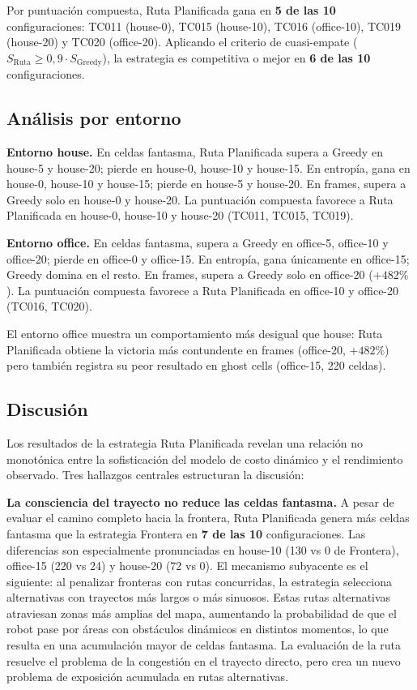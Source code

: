 Por puntuación compuesta, Ruta Planificada gana en \textbf{5 de las 10} configuraciones: TC011 (house-0), TC015 (house-10), TC016 (office-10), TC019 (house-20) y TC020 (office-20). Aplicando el criterio de cuasi-empate ($S_{\text{Ruta}} \geq 0{,}9 \cdot S_{\text{Greedy}}$), la estrategia es competitiva o mejor en \textbf{6 de las 10} configuraciones.

\subsection{Análisis por entorno}

\textbf{Entorno house.} En celdas fantasma, Ruta Planificada supera a Greedy en house-5 y house-20; pierde en house-0, house-10 y house-15. En entropía, gana en house-0, house-10 y house-15; pierde en house-5 y house-20. En frames, supera a Greedy solo en house-0 y house-20. La puntuación compuesta favorece a Ruta Planificada en house-0, house-10 y house-20 (TC011, TC015, TC019).

\textbf{Entorno office.} En celdas fantasma, supera a Greedy en office-5, office-10 y office-20; pierde en office-0 y office-15. En entropía, gana únicamente en office-15; Greedy domina en el resto. En frames, supera a Greedy solo en office-20 ($+482\%$). La puntuación compuesta favorece a Ruta Planificada en office-10 y office-20 (TC016, TC020).

El entorno office muestra un comportamiento más desigual que house: Ruta Planificada obtiene la victoria más contundente en frames (office-20, $+482\%$) pero también registra su peor resultado en ghost cells (office-15, 220 celdas).

\subsection{Discusión}%
\label{sec:exp_e2_discusion}

Los resultados de la estrategia Ruta Planificada revelan una relación no monotónica entre la sofisticación del modelo de costo dinámico y el rendimiento observado. Tres hallazgos centrales estructuran la discusión:

\textbf{La consciencia del trayecto no reduce las celdas fantasma.} A pesar de evaluar el camino completo hacia la frontera, Ruta Planificada genera más celdas fantasma que la estrategia Frontera en \textbf{7 de las 10} configuraciones. Las diferencias son especialmente pronunciadas en house-10 (130 vs 0 de Frontera), office-15 (220 vs 24) y house-20 (72 vs 0). El mecanismo subyacente es el siguiente: al penalizar fronteras con rutas concurridas, la estrategia selecciona alternativas con trayectos más largos o más sinuosos. Estas rutas alternativas atraviesan zonas más amplias del mapa, aumentando la probabilidad de que el robot pase por áreas con obstáculos dinámicos en distintos momentos, lo que resulta en una acumulación mayor de celdas fantasma. La evaluación de la ruta resuelve el problema de la congestión en el trayecto directo, pero crea un nuevo problema de exposición acumulada en rutas alternativas.

